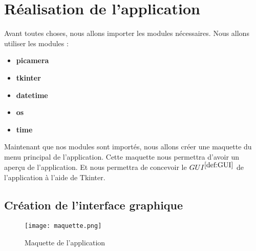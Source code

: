     
    \section{Réalisation de l'application}
        Avant toutes choses, nous allons importer les modules nécessaires.
        Nous allons utiliser les modules :
        \begin{itemize}
            \item \textbf{picamera}
            \item \textbf{tkinter}
            \item \textbf{datetime}
            \item \textbf{os}
            \item \textbf{time}
        \end{itemize}

        \begin{flushleft}
            Maintenant que nos modules sont importés, nous allons créer une maquette du menu principal de l'application.
            Cette maquette nous permettra d'avoir un aperçu de l'application.
            Et nous permettra de concevoir le \underline{$GUI^{\ref{def:GUI}}$} de l'application à l'aide de Tkinter.            
        \end{flushleft}

        \subsection{Création de l'interface graphique}
            \begin{figure}[h]
                \centering
                \texttt{[image: maquette.png]} 
                \caption{Maquette de l'application}
            \end{figure}

